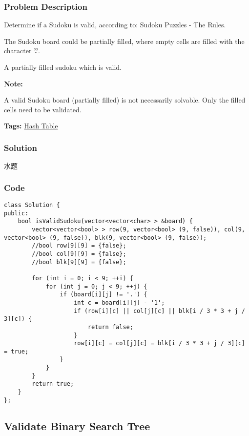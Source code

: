 \documentclass{article}
\begin{document}
\begin{CJK*}{UTF8}{gkai}
\subsubsection*{Problem Description}
Determine if a Sudoku is valid, according to: Sudoku Puzzles - The Rules.

The Sudoku board could be partially filled, where empty cells are filled with the character \textbf{'.'}.

A partially filled sudoku which is valid.

\textbf{Note:}


A valid Sudoku board (partially filled) is not necessarily solvable. Only the filled cells need to be validated.


\textbf{Tags: }
\hyperref[ Hash Table ]{ Hash Table }



\subsubsection*{Solution}
水题

\subsubsection*{Code}
\begin{lstlisting}
class Solution {
public:
    bool isValidSudoku(vector<vector<char> > &board) {
        vector<vector<bool> > row(9, vector<bool> (9, false)), col(9, vector<bool> (9, false)), blk(9, vector<bool> (9, false));
        //bool row[9][9] = {false};
        //bool col[9][9] = {false};
        //bool blk[9][9] = {false};
        
        for (int i = 0; i < 9; ++i) {
            for (int j = 0; j < 9; ++j) {
                if (board[i][j] != '.') {
                    int c = board[i][j] - '1';
                    if (row[i][c] || col[j][c] || blk[i / 3 * 3 + j / 3][c]) {
                        return false;
                    }
                    row[i][c] = col[j][c] = blk[i / 3 * 3 + j / 3][c] = true;
                }
            }
        }
        return true;
    }
}; 
\end{lstlisting}


\subsection{ Validate Binary Search Tree }
\label{ Validate Binary Search Tree }


\end{CJK*}
\end{document}
